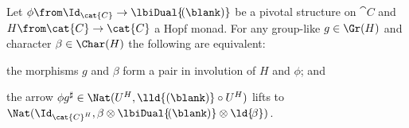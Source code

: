 \begin{lemma}\label{lem: s2-is-conjugate}
  Let \(\phi \from \Id_{\cat{C}} \to \lbiDual{\!(\blank)}\) be a pivotal structure on \(\cat{C}\)
  and \(H \from \cat{C} \to \cat{C}\) a Hopf monad.
  For any group-like \(g \in \Gr(H)\) and character \(\beta \in \Char(H)\) the following are equivalent:
  \begin{thmlist}[noitemsep]
    \item the morphisms \(g\) and \(\beta\) form a pair in involution of \(H\) and \(\phi\); and
    \item the arrow \(\phi g^{\sharp}\in \Nat(U^H, \lld{(\blank)} \circ U^H)\) lifts
    to \(\Nat(\Id_{\cat{C}^H}, \beta \otimes \lbiDual{\!(\blank)}\otimes \ld{\!\beta} )\).
  \end{thmlist}
\end{lemma}
